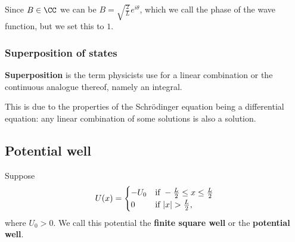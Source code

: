 \documentclass[12pt, a4paper]{article}
\begin{document}
\begin{mdremark}
    Since \(B \in \CC\) we can be \(B = \sqrt{\frac{2}{L}} e^{i\theta}\), which we call the phase of the wave function, but we set this to \(1\).
\end{mdremark}

\subsubsection{Superposition of states}

\begin{definition}
    \textbf{Superposition} is the term physicists use for a linear combination or the continuous analogue thereof, namely an integral.
\end{definition}

\begin{mdremark}
    This is due to the properties of the Schrödinger equation being a differential equation: any linear combination of some solutions is also a solution.
\end{mdremark}

\subsection{Potential well}

\begin{definition}
    Suppose 
    \[U(x) = \begin{cases}
        -U_0 &\text{if } -\frac{L}{2} \leq x \leq \frac{L}{2} \\
        0 &\text{if } \abs{x} > \frac{L}{2},
    \end{cases}\]
    where \(U_0>0\). We call this potential the \textbf{finite square well} or the \textbf{potential well}.
\end{definition}
\end{document}
